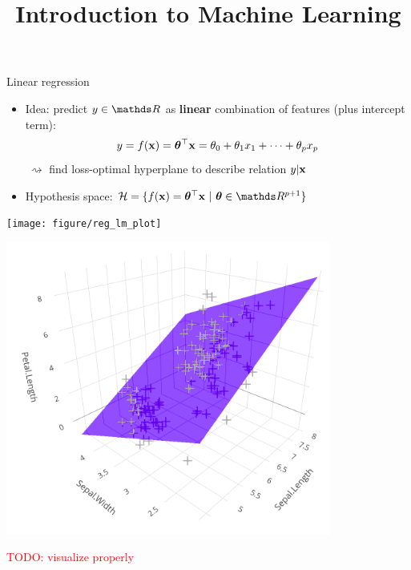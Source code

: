 \documentclass[11pt,compress,t,notes=noshow, xcolor=table]{beamer}
\title{Introduction to Machine Learning}
\institute{\href{https://compstat-lmu.github.io/lecture_i2ml/}{compstat-lmu.github.io/lecture\_i2ml}}
\date{}
\begin{document}

\begin{vbframe}{Linear regression}

\begin{itemize}
    \item Idea: predict $y \in \R$ as \textbf{linear} combination of features
    (plus intercept term):
    $$y = f(\mathbf{x}) = \bm{\theta}^\top \mathbf{x} = \theta_0 + \theta_1 x_1 + \dots + \theta_p x_p$$
    $~\rightsquigarrow$ find loss-optimal hyperplane to describe relation 
    $y | \mathbf{x}$
    \item Hypothesis space: $\Hspace = \{\fx = \thx\ |\ \thetab \in \R^{p+1} \}$
    
\end{itemize}
\vfill
    \begin{minipage}{0.45\textwidth}
        \texttt{[image: figure/reg\_lm\_plot]} 
    \end{minipage}
    \hfill
    \begin{minipage}{0.45\textwidth}
        \includegraphics[width=0.8\textwidth]{figure/ss_regr_bivariate} 
        
        \textcolor{red}{TODO: visualize properly}
    \end{minipage}

\end{vbframe}

\end{document}
